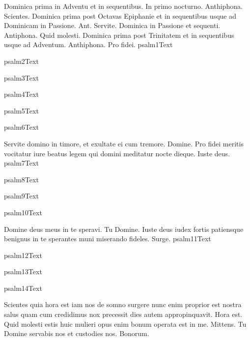 \documentclass[11pt,openany]{book}
\newcommand{\fullpsalm}[1]{%
	\begingroup %
		\setlength{\parindent}{1em} %
		\renewcommand{\\}{\par\hspace*{1em}} %
		\csname psalm#1Text\endcsname %
	\endgroup %
}
\begin{document}
\begin{multicols*}{2}

\noindent Dominica prima in Adventu et in sequentibus. In primo nocturno. Anthiphona.
 Scientes.
\newline Dominica prima post Octavas Epiphanie et in sequentibus usque ad Dominicam in Passione. Ant.
 Servite.
\newline Dominica in Passione et sequenti. Antiphona.
 Quid molesti.
\newline Dominica prima post Trinitatem et in sequentibus usque ad Adventum. Anthiphona.
 Pro fidei.
\fullpsalm{1}
\fullpsalm{2}
\fullpsalm{3}
\fullpsalm{4}
\fullpsalm{5}
\fullpsalm{6}
 Servite domino in timore, et exultate ei cum tremore.
 Domine.
 Pro fidei meritis vocitatur iure beatus legem qui domini meditatur nocte dieque.
 Iuste deus.
\fullpsalm{7}
\fullpsalm{8}
\fullpsalm{9}
\fullpsalm{10}
 Domine deus meus in te speravi.
 Tu Domine.
 Iuste deus iudex fortis patiensque benignus in te sperantes muni miserando fideles.
 Surge.
\fullpsalm{11}
\fullpsalm{12}
\fullpsalm{13}
\fullpsalm{14}
 Scientes quia hora est iam nos de somno surgere nunc enim proprior est nostra salus quam cum credidimus nox precessit dies autem appropinquavit.
 Hora est.
 Quid molesti estis huic mulieri opus enim bonum operata est in me.
 Mittens.
 Tu Domine servabis nos et custodies nos.
 Bonorum.

\end{multicols*}
\end{document}
